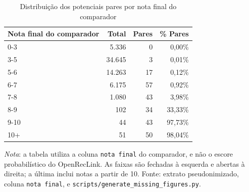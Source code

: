 \begin{table}[htbp]
\centering
\caption{Distribuição dos potenciais pares por nota final do comparador}
\label{tab:score-bands}
\begin{tabular}{lrrr}
\toprule
Nota final do comparador & Total & Pares & \% Pares \\
\midrule
    0-3 & 5.336 & 0 & 0,00\% \\
    3-5 & 34.645 & 3 & 0,01\% \\
    5-6 & 14.263 & 17 & 0,12\% \\
    6-7 & 6.175 & 57 & 0,92\% \\
    7-8 & 1.080 & 43 & 3,98\% \\
    8-9 & 102 & 34 & 33,33\% \\
    9-10 & 44 & 43 & 97,73\% \\
    10+ & 51 & 50 & 98,04\% \\
\bottomrule
\end{tabular}

\smallskip
{\footnotesize\textit{Nota}: a tabela utiliza a coluna \texttt{nota final} do comparador, e não o escore probabilístico do OpenRecLink. As faixas são fechadas à esquerda e abertas à direita; a última inclui notas a partir de 10. Fonte: extrato pseudonimizado, coluna \texttt{nota final}, e \texttt{scripts/generate\_missing\_figures.py}.}
\end{table}
